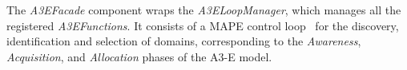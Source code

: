 
The \textit{A3EFacade} component wraps the \textit{A3ELoopManager}, which manages all the registered \textit{A3EFunctions}. It consists of a MAPE control loop~\cite{kephart2003vision} for the discovery, identification and selection of domains, corresponding to the \textit{Awareness}, \textit{Acquisition}, and \textit{Allocation} phases of the A3-E model. 


